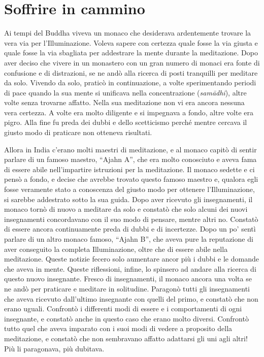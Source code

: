 \chapter{Soffrire in cammino}

Ai tempi del Buddha viveva un monaco che desiderava ardentemente trovare
la vera via per l'Illuminazione. Voleva sapere con certezza quale fosse
la via giusta e quale fosse la via sbagliata per addestrare la mente
durante la meditazione. Dopo aver deciso che vivere in un monastero con
un gran numero di monaci era fonte di confusione e di distrazioni, se ne
andò alla ricerca di posti tranquilli per meditare da solo. Vivendo da
solo, praticò in continuazione, a volte sperimentando periodi di pace
quando la sua mente si unificava nella concentrazione (\emph{samādhi}),
altre volte senza trovarne affatto. Nella sua meditazione non vi era
ancora nessuna vera certezza. A volte era molto diligente e si impegnava
a fondo, altre volte era pigro. Alla fine fu preda dei dubbi e dello
scetticismo perché mentre cercava il giusto modo di praticare non
otteneva risultati.

Allora in India c'erano molti maestri di meditazione, e al monaco capitò
di sentir parlare di un famoso maestro, ``Ajahn A'', che era molto
conosciuto e aveva fama di essere abile nell'impartire istruzioni per la
meditazione. Il monaco sedette e ci pensò a fondo, e decise che avrebbe
trovato questo famoso maestro e, qualora egli fosse veramente stato a
conoscenza del giusto modo per ottenere l'Illuminazione, si sarebbe
addestrato sotto la sua guida. Dopo aver ricevuto gli insegnamenti, il
monaco tornò di nuovo a meditare da solo e constatò che solo alcuni dei
nuovi insegnamenti concordavano con il suo modo di pensare, mentre altri
no. Constatò di essere ancora continuamente preda di dubbi e di
incertezze. Dopo un po' sentì parlare di un altro monaco famoso, ``Ajahn
B'', che aveva pure la reputazione di aver conseguito la completa
Illuminazione, oltre che di essere abile nella meditazione. Queste
notizie fecero solo aumentare ancor più i dubbi e le domande che aveva
in mente. Queste riflessioni, infine, lo spinsero ad andare alla ricerca
di questo nuovo insegnante. Fresco di insegnamenti, il monaco ancora una
volta se ne andò per praticare e meditare in solitudine. Paragonò tutti
gli insegnamenti che aveva ricevuto dall'ultimo insegnante con quelli
del primo, e constatò che non erano uguali. Confrontò i differenti modi
di essere e i comportamenti di ogni insegnante, e constatò anche in
questo caso che erano molto diversi. Confrontò tutto quel che aveva
imparato con i suoi modi di vedere a proposito della meditazione, e
constatò che non sembravano affatto adattarsi gli uni agli altri! Più li
paragonava, più dubitava.

